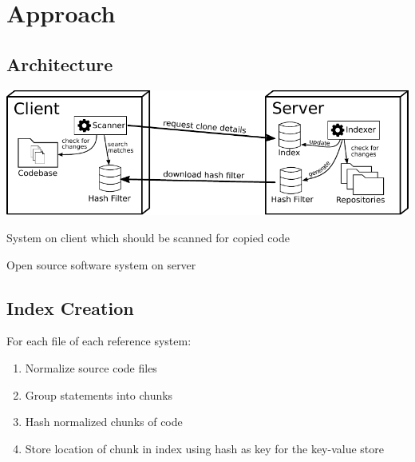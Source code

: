 
\section{Approach}

\subsection{Architecture}
\begin{frame}{\insertsubsection}
	\includegraphics[width=\linewidth]{../written/figures/architecture_overview.pdf}
	\begin{description}
		\small
		\item[Target System] System on client which should be scanned for copied code
		\item[Reference System] Open source software system on server
	\end{description}
\end{frame}

\subsection{Index Creation}
\begin{frame}{\insertsubsection}
	For each file of each reference system:
	\begin{enumerate}
		\item Normalize source code files
		\item Group statements into chunks
		\item Hash normalized chunks of code
		\item Store location of chunk in index using hash as key for the key-value store
	\end{enumerate}
\end{frame}

